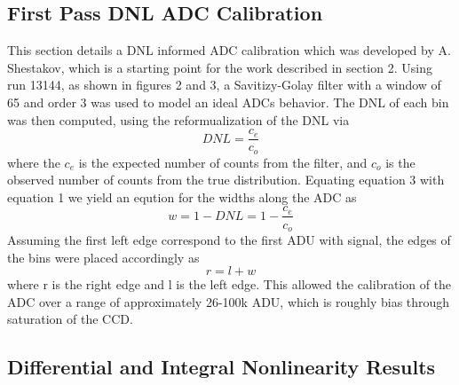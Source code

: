 \documentclass[11pt, letterpaper]{article}
\begin{document}
\subsection{First Pass DNL ADC Calibration}
\indent


This section details a DNL informed ADC calibration which was developed by A. Shestakov, which is a starting point for the work described in section 2. 
Using run 13144, as shown in figures 2 and 3, a Savitizy-Golay filter with a window of 65 and order 3 was used to model an ideal ADCs behavior. 
The DNL of each bin was then computed, using the reformualization of the DNL via 
 \begin{equation}\label{}
 DNL = \frac{c_e}{c_o}
 \end{equation}
where the $c_{e}$ is the expected number of counts from the filter, and $c_{o}$ is the observed number of counts from the true distribution. 
Equating equation 3 with equation 1 we yield an eqution for the widths along the ADC as
 \begin{equation}\label{}
 w = 1-DNL = 1- \frac{c_e}{c_o}
 \end{equation}
Assuming the first left edge correspond to the first ADU with signal, the edges of the bins were placed accordingly as
 \begin{equation}\label{}
r = l + w 
\end{equation}
where r is the right edge and l is the left edge. 
This allowed the calibration of the ADC over a range of approximately 26-100k ADU, which is roughly bias through saturation of the CCD.  


\subsection{Differential and Integral Nonlinearity Results}
\indent
\end{document}
